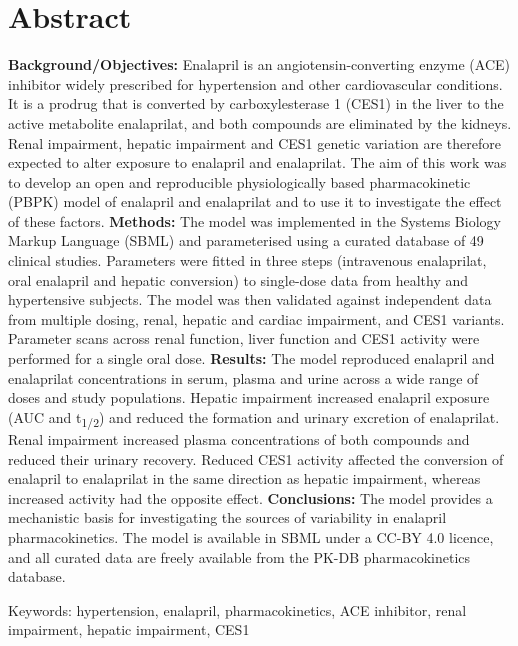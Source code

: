 \section*{Abstract}\label{sec:abstract}\justifying{}
\textbf{Background/Objectives:} Enalapril is an angiotensin-converting enzyme (ACE) inhibitor widely prescribed for hypertension and other cardiovascular conditions. It is a prodrug that is converted by carboxylesterase 1 (CES1) in the liver to the active metabolite enalaprilat, and both compounds are eliminated by the kidneys. Renal impairment, hepatic impairment and CES1 genetic variation are therefore expected to alter exposure to enalapril and enalaprilat. The aim of this work was to develop an open and reproducible physiologically based pharmacokinetic (PBPK) model of enalapril and enalaprilat and to use it to investigate the effect of these factors. \textbf{Methods:} The model was implemented in the Systems Biology Markup Language (SBML) and parameterised using a curated database of 49 clinical studies. Parameters were fitted in three steps (intravenous enalaprilat, oral enalapril and hepatic conversion) to single-dose data from healthy and hypertensive subjects. The model was then validated against independent data from multiple dosing, renal, hepatic and cardiac impairment, and CES1 variants. Parameter scans across renal function, liver function and CES1 activity were performed for a single oral dose. \textbf{Results:} The model reproduced enalapril and enalaprilat concentrations in serum, plasma and urine across a wide range of doses and study populations. Hepatic impairment increased enalapril exposure (AUC and t\textsubscript{1/2}) and reduced the formation and urinary excretion of enalaprilat. Renal impairment increased plasma concentrations of both compounds and reduced their urinary recovery. Reduced CES1 activity affected the conversion of enalapril to enalaprilat in the same direction as hepatic impairment, whereas increased activity had the opposite effect. \textbf{Conclusions:} The model provides a mechanistic basis for investigating the sources of variability in enalapril pharmacokinetics. The model is available in SBML under a CC-BY 4.0 licence, and all curated data are freely available from the PK-DB pharmacokinetics database.

Keywords: hypertension, enalapril, pharmacokinetics, ACE inhibitor, renal impairment, hepatic impairment, CES1
